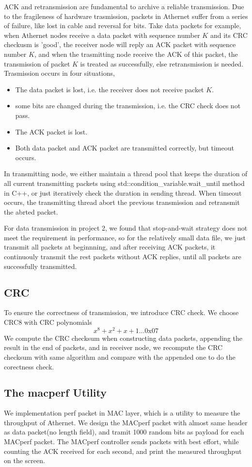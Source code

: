 \documentclass[11pt, conference]{IEEEtran}
\begin{document}
ACK and retransmission are fundamental to archive a reliable transmission. Due to the fragileness of hardware trasmission, packets in 
Athernet suffer from a series of failure, like lost in cable and reversal for bits. Take data packets for example, when Athernet nodes receive
a data packet with sequence number $K$ and its CRC checkusm is 'good', the receiver node will reply an ACK packet with sequence number $K$, and when the
trasmitting node receive the ACK of this packet, the transmission of packet $K$ is treated as successfully, else retransmission is needed. Trasmission occurs
in four situations,
\begin {itemize}
\item The data packet is lost, i.e. the receiver does not receive packet $K$.
\item some bits are changed during the transmission, i.e. the CRC check does not pass.
\item The ACK packet is lost.
\item Both data packet and ACK packet are transmitted correctly, but timeout occurs.
\end {itemize}
In transmitting node, we either maintain a thread pool that keeps the duration of all current transmitting packets using std::condition\_variable.wait\_until method
in C++, or just iteratively check the duration in sending thread. When timeout occurs, the transmitting thread abort the previous transmission and retransmit the abrted packet.

For data transmission in project 2, we found that stop-and-wait strategy does not meet the requirement in performance, so for the relatively small data file, we just transmit all
packets at beginnning, and after receiving ACK packets, it continuouly transmit the rest packets without ACK replies, until all packets are successfully transmitted.

\subsection{CRC}
To ensure the correctness of transmission, we introduce CRC check. We choose CRC8 with CRC polynomials
\[
    x^8 + x^2 + x + 1 \dots 0\text{x}07
\]
We compute the CRC checksum when constructing data packets, appending the result in the end of packets, and in receiver node, we recompute the CRC checksum with same algorithm and compare with the appended one to do the corectness check.
\subsection{The \textsf{macperf} Utility}
We implementation perf packet in MAC layer, which is a utility to measure the throughput of Athernet. We design the MACperf packet with almost same header as data packet(no length field), and tramit 1000 random bits as 
payload for each MACperf packet. The MACperf controller sends packets with best effort, while counting the ACK received for each second, and print the measured throughput on the screen.
\end{document}
